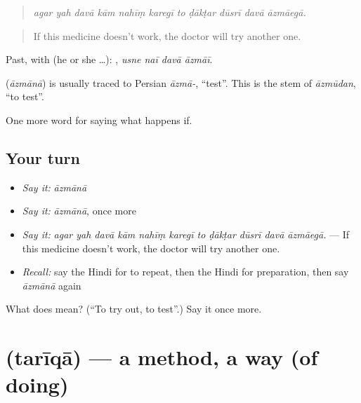 \begin{quote}
          
\end{quote}

\begin{quote}
\emph{agar yah davā kām nahīṃ karegī to ḍākṭar dūsrī davā āzmāegā.}
\end{quote}

\begin{quote}
If this medicine doesn't work, the doctor will try another one.
\end{quote}

Past, with  (he or she …):    , \emph{usne naī davā āzmāī}.

\begin{cousinweb}
\textbf{} (\emph{āzmānā}) is usually traced to Persian \emph{āzmā-}, \textquotedblleft{}test\textquotedblright{}. This is the stem of \emph{āzmūdan}, \textquotedblleft{}to test\textquotedblright{}.
\end{cousinweb}

\begin{grammarlens}[title={What you've built}]
One more word for saying what happens if.
\end{grammarlens}

\subsection*{Your turn}
\begin{itemize}
\raggedright
  \item \emph{Say it:} \emph{āzmānā}
  \item \emph{Say it:} \emph{āzmānā}, once more
  \item \emph{Say it:} \emph{agar yah davā kām nahīṃ karegī to ḍākṭar dūsrī davā āzmāegā.} — If this medicine doesn't work, the doctor will try another one.
  \item \emph{Recall:} say the Hindi for to repeat, then the Hindi for preparation, then say \emph{āzmānā} again
\end{itemize}

\begin{tcolorbox}[breakable,colback=teal!4,colframe=teal!35!black,title={Before you move on}]
What does  mean? (\textquotedblleft{}To try out, to test\textquotedblright{}.) Say it once more.
\end{tcolorbox}
\section[\texorpdfstring{\hi{तरीक़ा} (tarīqā)}{तरीक़ा (tarīqā)}]{ (tarīqā) — a method, a way (of doing)}

